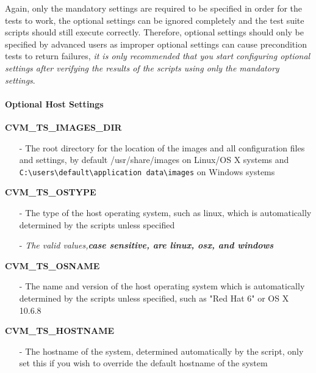 Again, only the mandatory settings are required to be specified in order for the tests to work, the optional settings 
can be ignored completely and the test suite scripts should still execute correctly. Therefore, optional settings should
only be specified by advanced users as improper optional settings can cause precondition tests to return failures,
\emph{it is only recommended that you start configuring optional settings after verifying the results of the scripts 
using only the mandatory settings}.


\paragraph*{Optional Host Settings}
\begin{description}
\item {\bf CVM\_TS\_IMAGES\_DIR}
		\begin{itemize}
		\item[-]	The root directory for the location of the \cernvm images and all
				configuration files and settings, by default /usr/share/images on
				Linux/OS X systems and \verb|C:\users\default\application data\images|
				on Windows systems
		\end{itemize}

\item {\bf CVM\_TS\_OSTYPE}
		\begin{itemize}
		\item[-]	The type of the host operating system, such as linux,  which is automatically 
					determined by the scripts unless specified
		\item[-]	\emph{The valid values,\bf{case sensitive}, are linux, osx, and windows}
		\end{itemize}

\item {\bf CVM\_TS\_OSNAME}
		\begin{itemize}
		\item[-]	The name and version of the host operating system which is automatically determined by
					the scripts unless specified, such as "Red Hat 6" or OS X 10.6.8
		\end{itemize}
		
\item {\bf CVM\_TS\_HOSTNAME}
		\begin{itemize}
		\item[-]	The hostname of the system, determined automatically by the script,
				only set this if you wish to override the default hostname of the
				system
		\end{itemize}
\end{description}


